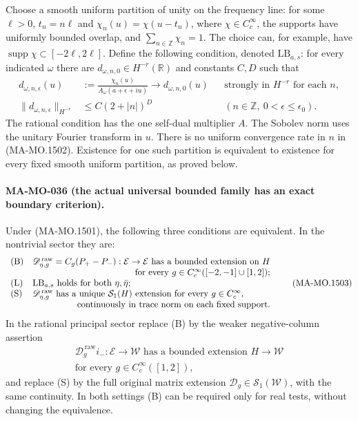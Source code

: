 Choose a smooth uniform partition of unity on the frequency
line: for some $\ell>0$, $t_n=n\ell$ and
$\chi_n(u)=\chi(u-t_n)$, where $\chi\in C_c^\infty$,
the supports have uniformly bounded overlap, and
$\sum_{n\in\mathbb Z}\chi_n=1$.  The choice can, for example,
have $\operatorname{supp}\chi\subset[-2\ell,2\ell]$.
Define the following condition, denoted $\mathrm{LB}_{a,s}$:
for every indicated $\omega$ there are
$d_{\omega,n,0}\in H^{-r}(\mathbb R)$ and constants $C,D$
such that
\[
\begin{aligned}
 d_{\omega,n,\epsilon}(u)
   &:=\frac{\chi_n(u)}{A_\omega(a+\epsilon+iu)}
       \longrightarrow d_{\omega,n,0}(u)
                &&\text{strongly in }H^{-r}\text{ for each }n,\\
 \|d_{\omega,n,\epsilon}\|_{H^{-r}}
   &\le C(2+|n|)^D
                &&(n\in\mathbb Z,\ 0<\epsilon\le\epsilon_0).
\end{aligned}
\tag{MA-MO.1502}
\]
The rational condition has the one self-dual multiplier $A$.
The Sobolev norm uses the unitary Fourier transform in $u$.
There is no uniform convergence rate in $n$ in (MA-MO.1502).
Existence for one such partition is equivalent to existence
for every fixed smooth uniform partition, as proved below.

\paragraph{MA-MO-036 (the actual universal bounded family has an exact boundary criterion).}
Under (MA-MO.1501), the following three conditions are equivalent.
In the nontrivial sector they are:
\[
\begin{array}{ll}
{\rm (B)}&
 \mathscr D_{\eta,g}^{\,\mathrm{raw}}
   =C_g(P_+-P_-):\mathcal E\to\mathcal E
 \text{ has a bounded extension on }H\\
&\hfill
 \text{for every }g\in C_c^\infty([-2,-1]\cup[1,2]);\\
{\rm (L)}&\mathrm{LB}_{a,s}\text{ holds for both }\eta,\bar\eta;\\
{\rm (S)}&
 \mathscr D_{\eta,g}^{\,\mathrm{raw}}\text{ has a unique }
 \mathcal S_1(H)\text{ extension for every }g\in C_c^\infty,\\
&\hfill\text{continuously in trace norm on each fixed support}.
\end{array}
\tag{MA-MO.1503}
\]
In the rational principal sector replace (B) by the weaker
negative-column assertion
\[
\begin{gathered}
 \mathscr D_g^{\,\mathrm{raw}}i_-:\mathcal E\to\mathcal W
 \text{ has a bounded extension }H\to\mathcal W\\
       \text{for every }g\in C_c^\infty([1,2]),
\end{gathered}
\tag{MA-MO.1504}
\]
and replace (S) by the full original matrix extension
$\mathscr D_g\in\mathcal S_1(\mathcal W)$, with the same
continuity.  In both settings (B) can be required only for
real tests, without changing the equivalence.

